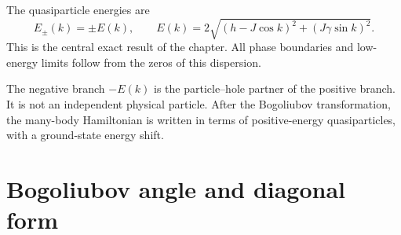 The quasiparticle energies are
\begin{equation}
\label{eq:xy-mother-quasiparticle-spectrum}
    E_\pm(k)=\pm E(k),
    \qquad
    E(k)
    =
    2\sqrt{(h-J\cos k)^2+(J\gamma\sin k)^2}.
\end{equation}
This is the central exact result of the chapter.  All phase boundaries and low-energy limits follow from the zeros of this dispersion.

\begin{remark}
The negative branch $-E(k)$ is the particle--hole partner of the positive branch.
It is not an independent physical particle.  After the Bogoliubov
transformation, the many-body Hamiltonian is written in terms of positive-energy
quasiparticles, with a ground-state energy shift.
\end{remark}

\section{Bogoliubov angle and diagonal form}
\label{sec:xy-bogoliubov-angle-diagonal-form}

